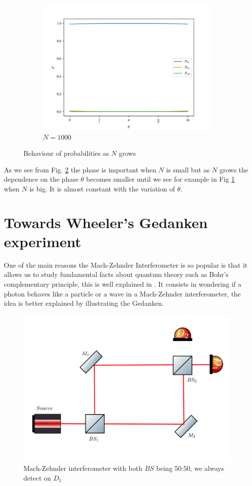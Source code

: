 \documentclass{book}
\begin{document}
\begin{figure}[H]
\begin{subfigure}[b]{0.30\linewidth}
\includegraphics[width=\linewidth]{images/Azuma_phases1000.png}
\caption{$N=1000$ }
\label{1000}
\end{subfigure}
\caption{Behaviour of probabilities as $N$ grows}
\label{con_fase}
\end{figure}

As we see from Fig. \ref{con_fase} the phase is important when $N$ is small but as $N$  grows the dependence on the phase $\theta$ becomes smaller until we see for example in Fig \ref{1000} when $N$ is big. It is almost constant with the variation of $\theta$.
\section{Towards Wheeler's Gedanken experiment}

One of the main reasons the Mach-Zehnder Interferometer is so popular is that it allows us to study fundamental facts about quantum theory such as Bohr's complementary principle, this is well explained in \cite{delayed}. It consists in wondering if a photon behaves like a particle or a wave in a Mach-Zehnder interferometer, the idea is better explained by illustrating the Gedanken.

\begin{figure}[H]
\centering
\includegraphics[width=\linewidth,height=6.5 cm]{images/wheeler1.png}
\caption{Mach-Zehnder interferometer with both $BS$ being 50:50, we always detect on $D_{1}$}
\label{wheeler1}
\end{figure}
\end{document}

